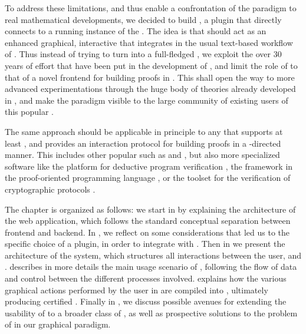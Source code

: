 To address these limitations, and thus enable a confrontation of the 
paradigm to real mathematical developments, we decided to build ,
a  plugin that directly connects  to a running instance of
the   \cite{coq-actema}. The idea is that
 should act as an enhanced graphical, interactive 
that integrates in the usual text-based workflow of . Thus
instead of trying to turn  into a full-fledged , we exploit
the over 30 years of effort that have been put in the development of ,
and limit the role of  to that of a novel frontend for building
proofs in . This shall open the way to more advanced experimentations
through the huge body of theories already developed in , and make the
 paradigm visible to the large community of existing users of this
popular .

\begin{remark}
  The same approach should be applicable in principle to any  that
  supports at least , and provides an interaction protocol for building
  proofs in a -directed manner. This includes other popular 
  such as  and , but also more specialized software like
  the  platform for deductive program verification
  \cite{boogie11why3}, the  framework in the proof-oriented
  programming language  \cite{martínez2019metaf}, or the
   toolset for the verification of cryptographic protocols
  \cite{Barthe2014}.
\end{remark}

The chapter is organized as follows: we start in  by explaining
the architecture of the  web application, which follows the standard
conceptual separation between frontend and backend. In , we
reflect on some considerations that led us to the specific choice of a 
plugin, in order to integrate  with . Then in
 we present the architecture of the  system,
which structures all interactions between the user,  and .
 describes in more details the main usage scenario of
, following the flow of data and control between the different
processes involved.  explains how the various graphical
actions performed by the user in  are compiled into 
, ultimately producing certified . Finally in
, we discuss possible avenues for extending the usability
of  to a broader class of  , as well as
prospective solutions to the problem of  in our graphical
paradigm.

